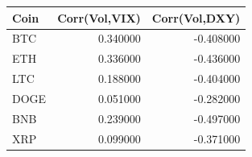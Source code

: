 \begin{tabular}{lrr}
\toprule
Coin & Corr(Vol,VIX) & Corr(Vol,DXY) \\
\midrule
BTC & 0.340000 & -0.408000 \\
ETH & 0.336000 & -0.436000 \\
LTC & 0.188000 & -0.404000 \\
DOGE & 0.051000 & -0.282000 \\
BNB & 0.239000 & -0.497000 \\
XRP & 0.099000 & -0.371000 \\
\bottomrule
\end{tabular}
